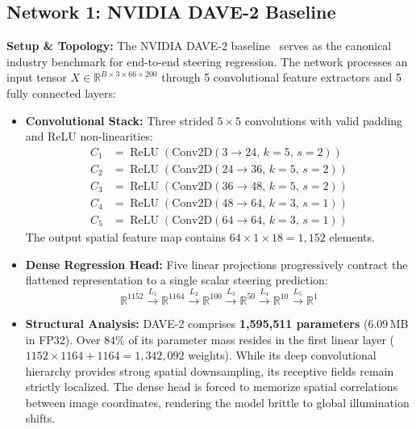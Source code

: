 \documentclass[10pt,journal,compsoc]{IEEEtran}
\begin{document}
\subsection{Network 1: NVIDIA DAVE-2 Baseline}
\textbf{Setup \& Topology:} The NVIDIA DAVE-2 baseline~\cite{bojarski2016end} serves as the canonical industry benchmark for end-to-end steering regression. The network processes an input tensor $X \in \mathbb{R}^{B \times 3 \times 66 \times 200}$ through 5 convolutional feature extractors and 5 fully connected layers:
\begin{itemize}
    \item \textbf{Convolutional Stack:} Three strided $5 \times 5$ convolutions with valid padding and ReLU non-linearities:
    \begin{align}
    C_1 &= \operatorname{ReLU}(\text{Conv2D}(3 \to 24, \, k=5, \, s=2)) \\
    C_2 &= \operatorname{ReLU}(\text{Conv2D}(24 \to 36, \, k=5, \, s=2)) \\
    C_3 &= \operatorname{ReLU}(\text{Conv2D}(36 \to 48, \, k=5, \, s=2)) \\
    C_4 &= \operatorname{ReLU}(\text{Conv2D}(48 \to 64, \, k=3, \, s=1)) \\
    C_5 &= \operatorname{ReLU}(\text{Conv2D}(64 \to 64, \, k=3, \, s=1))
    \end{align}
    The output spatial feature map contains $64 \times 1 \times 18 = 1,152$ elements.
    \item \textbf{Dense Regression Head:} Five linear projections progressively contract the flattened representation to a single scalar steering prediction:
    \begin{equation}
    \mathbb{R}^{1152} \xrightarrow{L_1} \mathbb{R}^{1164} \xrightarrow{L_2} \mathbb{R}^{100} \xrightarrow{L_3} \mathbb{R}^{50} \xrightarrow{L_4} \mathbb{R}^{10} \xrightarrow{L_5} \mathbb{R}^1
    \end{equation}
    \item \textbf{Structural Analysis:} DAVE-2 comprises \textbf{1,595,511 parameters} ($6.09$\,MB in FP32). Over $84\%$ of its parameter mass resides in the first linear layer ($1152 \times 1164 + 1164 = 1,342,092$ weights). While its deep convolutional hierarchy provides strong spatial downsampling, its receptive fields remain strictly localized. The dense head is forced to memorize spatial correlations between image coordinates, rendering the model brittle to global illumination shifts.
\end{itemize}
\end{document}
